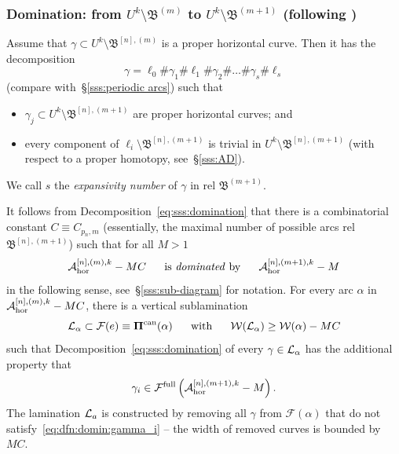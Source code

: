 \documentclass{amsart}
\newcommand\full{{\operatorname{full}}}
\newcommand{\bbush}{{\boldsymbol {\mathfrak B} }}
\newcommand{\bPi}{{\boldsymbol \Pi}}
\newcommand{\can}{{\operatorname{can}}}
\renewcommand{\sp}{{\ \ }}
\newcommand{\1}{{\mathbb 1 }}
\newcommand{\Fam}{{\mathcal F}}
\newcommand{\Width}{{\mathcal W}}
\renewcommand{\AA}{{\mathcal A}}
\begin{document}
\subsubsection{Domination: from $U^{k}\setminus \bbush^{(m)}$ to $U^{k}\setminus \bbush^{(m+1)}$ (following \cite[{\S3.6}]{K})} \label{sss:domination} 
Assume that $\gamma\subset U^{k}\setminus \bbush^{[n],(m)}$ is a proper horizontal curve. Then it has the decomposition 
\begin{equation}
\label{eq:sss:domination}
\gamma = \ell_0\#\gamma_1\# \ell_1 \#\gamma_2\# \dots \#\gamma_s\#\ell_s
\end{equation}
  (compare with~\S\ref{sss:periodic arcs}) such that
 \begin{itemize}
\item $\gamma_j\subset U^{k}\setminus \bbush^{[n],(m+1)}$ are proper horizontal curves; and
\item every component of $\ell_i\setminus \bbush^{[n],(m+1)}$ is trivial in $U^k\setminus \bbush^{[n],(m+1)}$  (with respect to a proper homotopy, see~\S\ref{sss:AD}).
\end{itemize} 
We call $s$ the \emph{expansivity number} of $\gamma$ in rel $\bbush^{(m+1)}$.


It follows from Decomposition~\eqref{eq:sss:domination} that there is a combinatorial constant $C\equiv C_{p_n,m}$ (essentially, the maximal number of possible arcs rel $\bbush^{[n],(m+1)}$) such that for all $M>1$ 
\begin{equation}
\label{eq:prop:dominat}
\AA^{[n],(m),k}_\hor- M C \sp\sp \text{ is \emph{dominated} by }\sp\sp \AA^{[n],(m+1),k}_\hor-M
\end{equation}in the following sense, see~\S\ref{sss:sub-diagram} for notation. For every arc $\alpha$ in $\AA^{[n],(m),k}_\hor- M C$, there is a vertical sublamination 
\[\LL_\alpha\subset \Fam(e)\equiv \bPi^\can (\alpha)\sp\sp\text{ with }\sp\sp \Width(\LL_\alpha) \ge \Width(\alpha) -  M C\]
such that Decomposition~\ref{eq:sss:domination} of every $\gamma\in {\mathcal L}_\alpha$ has the additional property that 
\begin{equation}
\label{eq:dfn:domin:gamma_i}
\gamma_i\in \Fam^\full \left(\AA^{[n],(m+1),k}_\hor-M\right).
\end{equation}
The lamination ${\mathcal L}_a$ is constructed by removing all $\gamma$ from $\Fam(\alpha)$ that do not satisfy~\eqref{eq:dfn:domin:gamma_i} -- the width of removed curves is bounded by  $ M C$.
\end{document}
